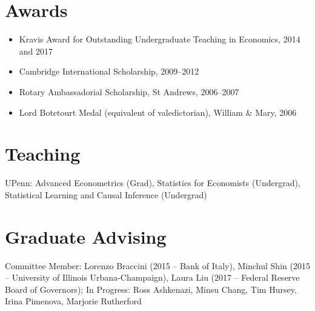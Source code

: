 \documentclass[line,overlapped]{myres}
\begin{document}
\begin{resume}


\section{\sc Awards}
\vspace{1em}
\begin{itemize}
\item Kravis Award for Outstanding Undergraduate Teaching in Economics, 2014 and 2017
\item Cambridge International Scholarship, 2009--2012
\item Rotary Ambassadorial Scholarship, St Andrews, 2006--2007
\item Lord Botetourt Medal (equivalent of valedictorian), William \& Mary, 2006
\end{itemize}

\section{\sc Teaching }
\vspace{0.5em}
	UPenn: Advanced Econometrics (Grad), Statistics for Economists (Undergrad), Statistical Learning and Causal Inference (Undergrad)
	


\section{\sc Graduate Advising}
\vspace{0.5em}
Committee Member: Lorenzo Braccini (2015 -- Bank of Italy), Minchul Shin (2015 -- University of Illinois Urbana-Champaign), Laura Liu (2017 -- Federal Reserve Board of Governors); In Progress: Ross Ashkenazi, Minsu Chang, Tim Hursey, Irina Pimenova, Marjorie Rutherford



\end{resume}
\end{document}

